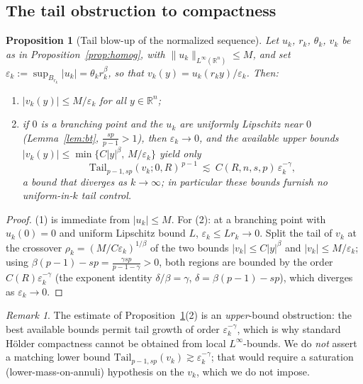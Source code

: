 \documentclass[11pt]{amsart}
\theoremstyle{plain}
\newtheorem{proposition}[theorem]{Proposition}
\theoremstyle{definition}
\theoremstyle{remark}
\newtheorem{remark}[theorem]{Remark}
\newcommand{\R}{\mathbb{R}}
\newcommand{\Tail}{\mathrm{Tail}_{p-1,sp}}
\begin{document}
\subsection{The tail obstruction to compactness}
\begin{proposition}[Tail blow-up of the normalized sequence]\label{prop:tailobstruction}
Let $u_k$, $r_k$, $\theta_k$, $v_k$ be as in Proposition~\ref{prop:homog}, with
$\|u_k\|_{L^\infty(\R^n)}\le M$, and set $\varepsilon_k:=\sup_{B_{r_k}}|u_k|
=\theta_k r_k^{\beta}$, so that $v_k(y)=u_k(r_ky)/\varepsilon_k$. Then:
\begin{enumerate}[leftmargin=2em]
\item $|v_k(y)|\le M/\varepsilon_k$ for all $y\in\R^n$;
\item if $0$ is a branching point and the $u_k$ are uniformly Lipschitz near
$0$ \textnormal{(Lemma~\ref{lem:bt}, $\frac{sp}{p-1}>1$)}, then
$\varepsilon_k\to0$, and the \emph{available} upper bounds
$|v_k(y)|\le\min\{C|y|^\beta,\,M/\varepsilon_k\}$ yield only
\[
  \Tail(v_k;0,R)^{\,p-1}\ \lesssim\ C(R,n,s,p)\,\varepsilon_k^{-\gamma},
\]
a bound that diverges as $k\to\infty$; in particular these bounds furnish
\emph{no} uniform-in-$k$ tail control.
\end{enumerate}
\end{proposition}
\begin{proof}
(1) is immediate from $|u_k|\le M$. For (2): at a branching point with
$u_k(0)=0$ and uniform Lipschitz bound $L$, $\varepsilon_k\le Lr_k\to0$. Split
the tail of $v_k$ at the crossover $\rho_k=(M/C\varepsilon_k)^{1/\beta}$ of the
two bounds $|v_k|\le C|y|^\beta$ and $|v_k|\le M/\varepsilon_k$; using
$\beta(p-1)-sp=\frac{\gamma sp}{p-1-\gamma}>0$, both regions are bounded by the
order $C(R)\varepsilon_k^{-\gamma}$ (the exponent identity $\delta/\beta=\gamma$,
$\delta=\beta(p-1)-sp$), which diverges as $\varepsilon_k\to0$.
\end{proof}

\begin{remark}\label{rem:tail-upper}
The estimate of Proposition~\ref{prop:tailobstruction}(2) is an
\emph{upper}-bound obstruction: the best available bounds permit tail growth of
order $\varepsilon_k^{-\gamma}$, which is why standard H\"older compactness
cannot be obtained from local $L^\infty$-bounds. We do \emph{not} assert a
matching lower bound $\Tail(v_k)\gtrsim\varepsilon_k^{-\gamma}$; that would
require a saturation (lower-mass-on-annuli) hypothesis on the $v_k$, which we
do not impose.
\end{remark}
\end{document}
